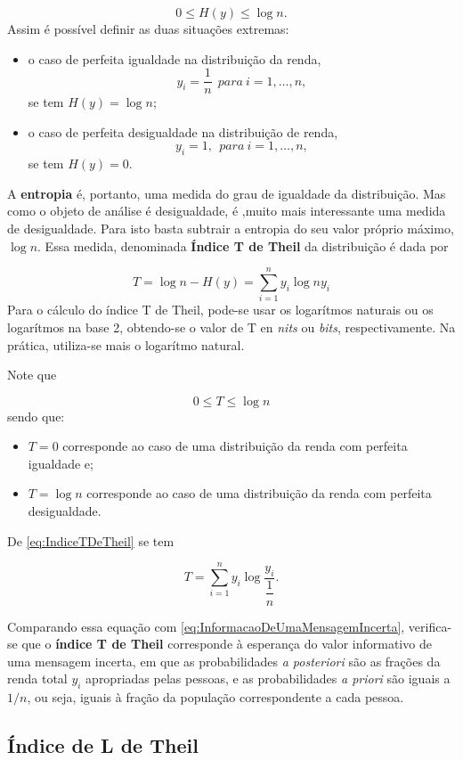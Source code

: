 \documentclass[
]{book}
\begin{document}
\[
  0\leq H(y) \leq \log n.
\]
Assim é possível definir as duas situações extremas:

\begin{itemize}
\item
  o caso de perfeita igualdade na distribuição da renda,
  \[
    y_i = \dfrac{1}{n}~~para~i=1, \ldots, n,
  \]
  se tem \(H(y) = \log n\);
\item
  o caso de perfeita desigualdade na distribuição de renda,
  \[
    y_i = 1,~~para~i=1, \ldots, n,
  \]
  se tem \(H(y) = 0\).
\end{itemize}

A \textbf{entropia} é, portanto, uma medida do grau de igualdade da distribuição. Mas como o objeto de análise é desigualdade, é ,muito mais interessante uma medida de desigualdade. Para isto basta subtrair a entropia do seu valor próprio máximo, \(\log n\). Essa medida, denominada \textbf{Índice T de Theil} da distribuição é dada por

\[
T = \log n - H(y) = \sum_{i=1}^{n}y_i \log n y_i
\label{eq:IndiceTDeTheil}
\]
Para o cálculo do índice T de Theil, pode-se usar os logarítmos naturais ou os logarítmos na base 2, obtendo-se o valor de T en \emph{nits} ou \emph{bits}, respectivamente. Na prática, utiliza-se mais o logarítmo natural.

Note que

\[
  0 \leq T \leq \log n
  \label{eq:IntervaloDoIndiceTDeTheil}
\]
sendo que:

\begin{itemize}
\item
  \(T = 0\) corresponde ao caso de uma distribuição da renda com perfeita igualdade e;
\item
  \(T = \log n\) corresponde ao caso de uma distribuição da renda com perfeita desigualdade.
\end{itemize}

De \eqref{eq:IndiceTDeTheil} se tem

\[
  T = \sum_{i=1}^{n}y_i \log \dfrac{y_i}{\dfrac{1}{n}}.
\]

Comparando essa equação com \eqref{eq:InformacaoDeUmaMensagemIncerta}, verifica-se que o \textbf{índice T de Theil} corresponde à esperança do valor informativo de uma mensagem incerta, em que as probabilidades \emph{a posteriori} são as frações da renda total \(y_i\) apropriadas pelas pessoas, e as probabilidades \emph{a priori} são iguais a \(1/n\), ou seja, iguais à fração da população correspondente a cada pessoa.

\hypertarget{uxedndice-de-l-de-theil}{%
\subsection{Índice de L de Theil}\label{uxedndice-de-l-de-theil}}
\end{document}
